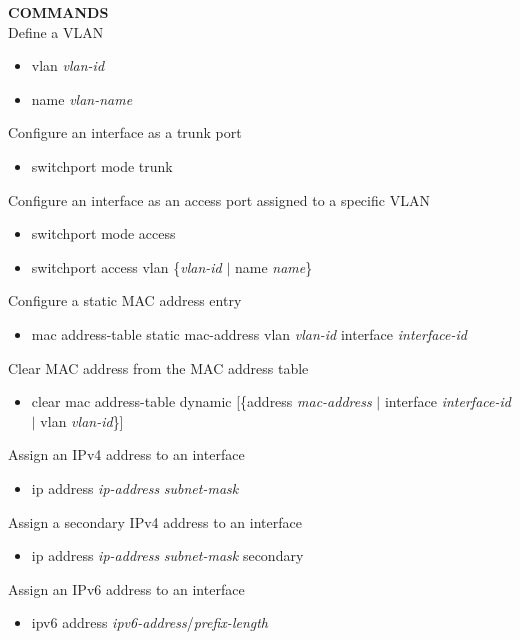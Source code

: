 \documentclass{article}
\begin{document}
\noindent\textbf{COMMANDS}\\
\noindent Define a VLAN
\begin{itemize}
\item vlan \textit{vlan-id}
\item name \textit{vlan-name}
\end{itemize}

Configure an interface as a trunk port
\begin{itemize}
\item switchport mode trunk
\end{itemize}

Configure an interface as an access port assigned to a specific VLAN
\begin{itemize}
\item switchport mode access
\item switchport access vlan \{\textit{vlan-id} $|$ name \textit{name}\}
\end{itemize}

Configure a static MAC address entry
\begin{itemize}
\item mac address-table static mac-address vlan \textit{vlan-id} interface \textit{interface-id}
\end{itemize}

Clear MAC address from the MAC address table
\begin{itemize}
\item clear mac address-table dynamic [\{address \textit{mac-address} $|$ interface \textit{interface-id} $|$ vlan \textit{vlan-id}\}]
\end{itemize}

Assign an IPv4 address to an interface
\begin{itemize}
\item ip address \textit{ip-address} \textit{subnet-mask}
\end{itemize}

Assign a secondary IPv4 address to an interface
\begin{itemize}
\item ip address \textit{ip-address} \textit{subnet-mask} secondary
\end{itemize}

Assign an IPv6 address to an interface
\begin{itemize}
\item ipv6 address \textit{ipv6-address}/\textit{prefix-length}
\end{itemize}
\end{document}
